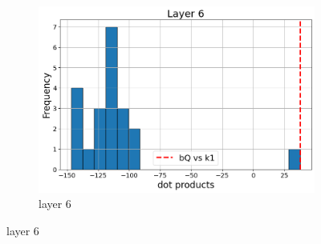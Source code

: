 \documentclass[11pt]{article}
\begin{document}
\begin{figure}[t]
\begin{subfigure}[t]{0.24\textwidth}
    \includegraphics[width=1.4\columnwidth]{figures/obs1_appendix/obs1_layer6.png}
    \caption{layer 6}
  \end{subfigure}\hfill
    \vspace{2mm}


\end{figure}
\end{document}
